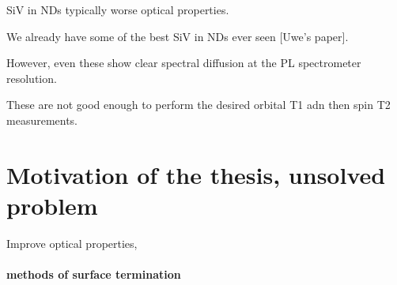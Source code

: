 SiV in NDs typically worse optical properties.

We already have some of the best SiV in NDs ever seen [Uwe's paper].

However, even these show clear spectral diffusion at the PL spectrometer resolution.

These are not good enough to perform the desired orbital T1 adn then spin T2 measurements.


\section[Motivation of the thesis, unsolved problem]{Motivation of the thesis, unsolved problem}
Improve optical properties, 
\paragraph{methods of surface termination}
